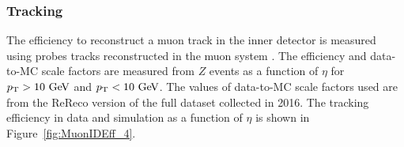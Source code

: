 
\subsubsection{Tracking}
The efficiency to reconstruct a muon track in the inner detector is measured using probes tracks
reconstructed in the muon system \cite{CMS_AN_2015-215}. The efficiency and 
data-to-MC scale factors are measured from $Z$ events as a function of $\eta$ for $p_{\rm{T}} > 10\ \mathrm{Ge\kern -0.1em V}$ and $p_{\rm{T}} < 10\ \mathrm{Ge\kern -0.1em V}$. The values of data-to-MC scale factors 
used are from the ReReco version of the full dataset collected in 2016. 
The tracking efficiency in data and simulation as a function of $\eta$ is shown in Figure~\ref{fig:MuonIDEff_4}.

